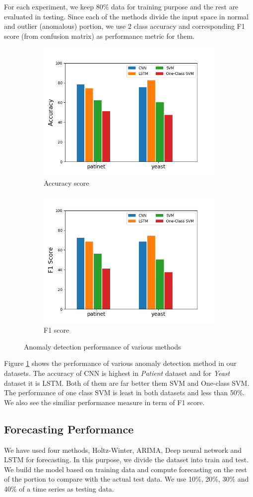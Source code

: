 For each experiment, we keep 80\% data for training purpose and the rest are evaluated in testing. Since each of the methods divide the input space
in normal and outlier (anomalous) portion, we use 2 class accuracy and
corresponding F1 score (from confusion matrix) as performance metric for
them. 
\begin{figure}[]
	\centering
	\begin{subfigure}{0.5\columnwidth}
		\centering
		\includegraphics[width=\columnwidth, height=4 cm]{Figures/anomaly_acc.png}
		\caption{Accuracy score}
	\end{subfigure}%
	\begin{subfigure}{0.5\columnwidth}
		\centering
			\includegraphics[width=\columnwidth, height=4 cm]{Figures/anomaly_f1.png}
		\caption{F1 score}
	\end{subfigure}%
	\caption{Anomaly detection performance of various methods}
	\label{fig-anomaly}
\end{figure}

Figure \ref{fig-anomaly} shows the performance of various anomaly detection method in our datasets. The accuracy of CNN is highest in \textit{Patient} dataset and for \textit{Yeast} dataset it is LSTM. Both of them are far better them SVM and One-class SVM. The performance of one class SVM is least in both datasets and less than 50\%. We also see the similiar performance measure in term of F1 score. 

\subsection{Forecasting Performance} 
We have used four methods, Holtz-Winter, ARIMA, Deep neural network and LSTM for forecasting. In this purpose, we divide the dataset into train and test. We build the model based on training data and compute forecasting on the rest of the portion to compare with the actual test data. We use 10\%, 20\%, 30\% and 40\% of a time series as testing data. 

